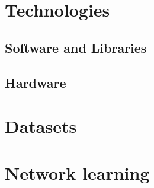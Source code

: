 \section{Technologies}
\subsection{Software and Libraries}
\subsection{Hardware}
\section{Datasets}
\section{Network learning}